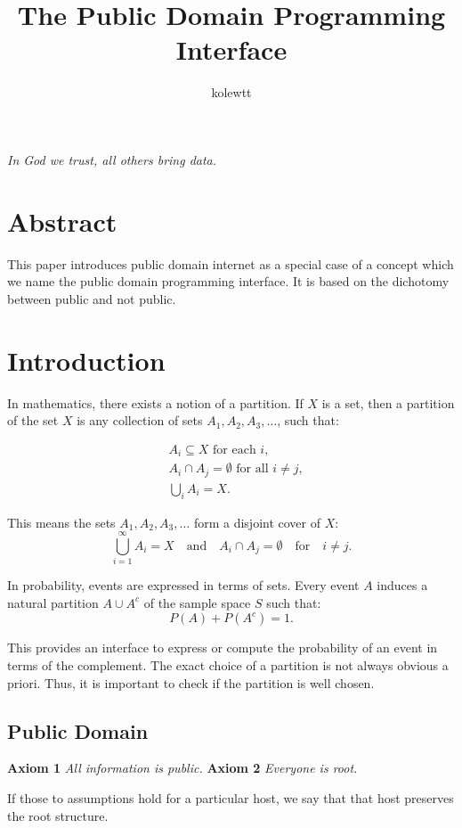 \documentclass{article}
\title{The Public Domain Programming Interface}
\author{kolewtt}
\begin{document}
\maketitle

\textit{In God we trust, all others bring data.}

\section*{Abstract}
This paper introduces public domain internet as a special case of a concept
which we name the public domain programming interface. It is based on the
dichotomy between public and not public.

\section*{Introduction}
In mathematics, there exists a notion of a partition. If $X$ is a set, then a
partition of the set $X$ is any collection of sets $A_{1}, A_{2}, A_{3}, \dots$,
such that:

\begin{align*}
  & A_i \subseteq X \text{ for each } i, \\
  & A_i \cap A_j = \emptyset \text{ for all } i \neq j, \\
  & \bigcup_{i} A_i = X.
\end{align*}

This means the sets $A_1, A_2, A_3, \dots$ form a disjoint cover of $X$:
\[
\bigcup_{i=1}^{\infty} A_i = X \quad \text{and} \quad A_i \cap A_j = \emptyset \quad \text{for} \quad i \neq j.
\]

In probability, events are expressed in terms of sets. Every event $A$ induces
a natural partition $A \cup A^{c}$ of the sample space $S$ such that:
\[
P(A) + P(A^{c}) = 1.
\]

This provides an interface to express or compute the probability of an event in
terms of the complement. The exact choice of a partition is not always obvious
a priori. Thus, it is important to check if the partition is well chosen.

\subsection*{Public Domain}
\textbf{Axiom 1} \textit{All information is public.}
\textbf{Axiom 2} \textit{Everyone is root.}

If those to assumptions hold for a particular host, we say that that host
preserves the root structure.
\end{document}
